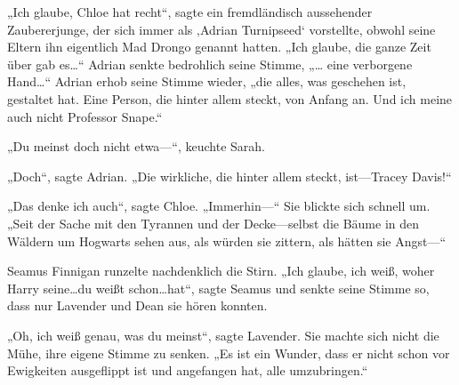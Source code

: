 „Ich glaube, Chloe hat recht“, sagte ein fremdländisch aussehender Zaubererjunge, der sich immer als ‚Adrian Turnipseed‘ vorstellte, obwohl seine Eltern ihn eigentlich Mad Drongo genannt hatten. „Ich glaube, die ganze Zeit über gab es…“ Adrian senkte bedrohlich seine Stimme, „… eine verborgene Hand…“ Adrian erhob seine Stimme wieder, „die alles, was geschehen ist, gestaltet hat. Eine Person, die hinter allem steckt, von Anfang an. Und ich meine auch nicht Professor Snape.“

„Du meinst doch nicht etwa—“, keuchte Sarah.

„Doch“, sagte Adrian. „Die wirkliche, die hinter allem steckt, ist—Tracey Davis!“

„Das denke ich auch“, sagte Chloe. „Immerhin—“ Sie blickte sich schnell um. „Seit der Sache mit den Tyrannen und der Decke—selbst die Bäume in den Wäldern um Hogwarts sehen aus, als würden sie zittern, als hätten sie Angst—“

Seamus Finnigan runzelte nachdenklich die Stirn. „Ich glaube, ich weiß, woher Harry seine…du weißt schon…hat“, sagte Seamus und senkte seine Stimme so, dass nur Lavender und Dean sie hören konnten.

„Oh, ich weiß genau, was du meinst“, sagte Lavender. Sie machte sich nicht die Mühe, ihre eigene Stimme zu senken. „Es ist ein Wunder, dass er nicht schon vor Ewigkeiten ausgeflippt ist und angefangen hat, alle umzubringen.“


